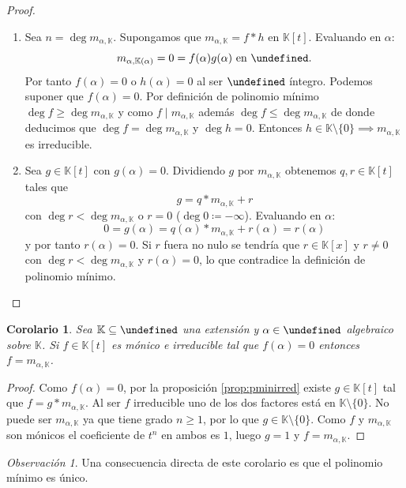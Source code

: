 \documentclass[10pt, spanish]{report}
\newtheorem{cor}{Corolario}[tma]
\theoremstyle{definition}
\theoremstyle{custom}
\theoremstyle{remark}
\newtheorem*{obs}{Observación}
\newcommand{\K}{\mathbb{K}}
\let\L\undefined
\newcommand{\L}{\mathbb{L}}
\renewcommand{\geq}{\geqslant}
\renewcommand{\leq}{\leqslant}
\begin{document}
\begin{proof}\hspace{0pt}
    \begin{enumerate}
        \item Sea $n=\deg{m_{\alpha,\K}}$. Supongamos que $m_{\alpha,\K}=f*h$ en
            $\K[t]$. Evaluando en $\alpha$:
            \[m_{\alpha,\K(\alpha)}=0=f(\alpha)g(\alpha)\text{ en }\L.\]
            Por tanto $f(\alpha)=0$ o $h(\alpha)=0$ al ser $\L$
            íntegro. Podemos suponer que $f(\alpha)=0$. Por definición de
            polinomio mínimo $\deg{f}\geq\deg{m_{\alpha,\K}}$ y como
            $f\mid m_{\alpha,\K}$ además $\deg{f}\leq \deg{m_{\alpha,\K}}$ de
            donde deducimos que $\deg{f}=\deg{m_{\alpha,\K}}$ y $\deg{h}=0$.
            Entonces $h\in\K\setminus\{0\}\implies m_{\alpha,\K}$ es
            irreducible.
        \item Sea $g\in\K[t]$ con $g(\alpha)=0$. Dividiendo $g$ por
            $m_{\alpha,\K}$ obtenemos $q,r\in\K[t]$ tales que \[g=q*m_{\alpha,
            \K}+r\] con $\deg{r}<\deg{m_{\alpha,\K}}$ o $r=0$
            ($\deg{0}\coloneqq-\infty$). Evaluando en $\alpha$:
            \[0=g(\alpha)=q(\alpha)*m_{\alpha,\K}+r(\alpha)=r(\alpha)\]
            y por tanto $r(\alpha)=0$. Si $r$ fuera no nulo se tendría que
            $r\in\K[x]$ y $r\neq 0$ con $\deg{r}<\deg{m_{\alpha,\K}}$ y
            $r(\alpha) = 0$, lo que contradice la definición de polinomio
            mínimo.
    \end{enumerate}
    \vspace{-1.75em}
\end{proof}


\begin{cor}
    Sea $\K\subseteq\L$ una extensión y $\alpha\in\L$ algebraico sobre $\K$. Si
    $f\in\K[t]$ es mónico e irreducible tal que $f(\alpha)=0$ entonces
    $f=m_{\alpha,\K}$.
\end{cor}

\begin{proof}
    Como $f(\alpha)=0$, por la proposición \ref{prop:pminirred} existe
    $g\in\K[t]$ tal que $f=g*m_{\alpha,\K}$. Al ser $f$ irreducible uno de los
    dos factores está en $\K\setminus\{0\}$.
    No puede ser $m_{\alpha,\K}$ ya que tiene grado $n\geq1$, por lo que $g\in\K
    \setminus\{0\}$. Como $f$ y $m_{\alpha,\K}$ son mónicos el coeficiente de
    $t^n$ en ambos es $1$, luego $g=1$ y $f=m_{\alpha,\K}$.
\end{proof}

\begin{obs}
    Una consecuencia directa de este corolario es que el polinomio mínimo es
    único.
\end{obs}
\end{document}
